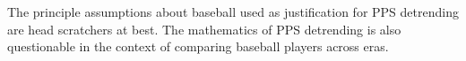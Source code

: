 \documentclass[11pt]{article}\usepackage[]{graphicx}\usepackage[]{color}
\begin{document}
The principle assumptions about baseball used as justification for PPS 
detrending are head scratchers at best.  The mathematics of PPS detrending 
is also questionable in the context of comparing baseball players across eras. 
\end{document}
